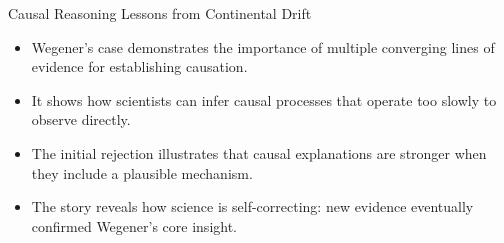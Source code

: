 \documentclass{beamer}
\begin{document}
\begin{frame}{Causal Reasoning Lessons from Continental Drift}
    \begin{itemize}
        \item Wegener's case demonstrates the importance of multiple converging lines of evidence for establishing causation.
        \item It shows how scientists can infer causal processes that operate too slowly to observe directly.
        \item The initial rejection illustrates that causal explanations are stronger when they include a plausible mechanism.
        \item The story reveals how science is self-correcting: new evidence eventually confirmed Wegener's core insight.
    \end{itemize}
    
    \begin{center}
    \end{center}
\end{frame}
\end{document}
